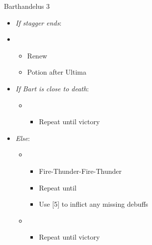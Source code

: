 \begin{battle}[1:24]{Barthandelus 3}
\begin{multicols}{2}
\begin{itemize}
            \columnbreak
      \item \textit{If stagger ends}:
      \item \third
            \begin{itemize}
              \item Renew
              \item Potion after Ultima
            \end{itemize}
      \item \textit{If Bart is close to death}:
            \begin{itemize}
              \item \first
                    \begin{itemize}
                      \item Repeat until victory
                    \end{itemize}
            \end{itemize}
      \item \textit{Else}:
            \begin{itemize}
              \item \sixth
                    \begin{itemize}
                      \item Fire-Thunder-Fire-Thunder
                      \item Repeat until \stagger
                      \item Use [5] to inflict any missing debuffs
                    \end{itemize}
              \item \first
                    \begin{itemize}
                      \item Repeat until victory
                    \end{itemize}
            \end{itemize}
    \end{itemize}
  \end{multicols}
\end{battle}
